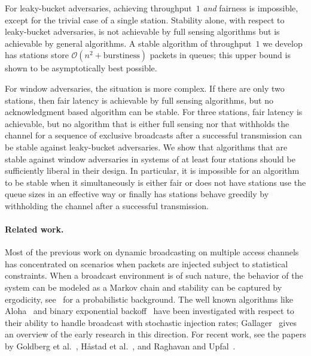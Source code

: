 \documentclass[11pt]{article}
\newcommand{\BBB}{\vspace*{-\bigskipamount}}
\newcommand{\cO}{\mathcal{O}}
\newcommand{\Paragraph}[1]{\BBB\paragraph{#1}}
\begin{document}
For leaky-bucket adversaries, achieving throughput~$1$ \emph{and} fairness is impossible, except for the trivial case of a single station.
Stability alone, with respect to leaky-bucket adversaries, is not achievable by full sensing algorithms but is achievable by general algorithms.
A stable algorithm of throughput~$1$ we develop has stations store $\cO(n^2+\text{burstiness})$ packets in queues; this upper bound is shown to be asymptotically best possible.

For window adversaries, the situation is more complex.
If there are only two stations, then fair latency is achievable by full sensing algorithms, but no acknowledgment based algorithm can be stable.
For three stations, fair latency is achievable, but no algorithm that is either full sensing nor that withholds the channel for a sequence of exclusive broadcasts after a successful transmission can be stable against leaky-bucket adversaries.
We show that algorithms that are stable against window adversaries in systems of at least four stations should be sufficiently liberal in their design.
In particular, it is impossible for an algorithm to be stable when it simultaneously is either fair or does not have stations use the queue sizes in an effective way or finally has stations behave greedily by withholding the channel after a successful transmission.





\Paragraph{Related work.}



Most of the previous work on dynamic broadcasting on multiple access channels has concentrated on scenarios when packets are injected subject to statistical constraints.
When a broadcast environment is of such nature, the behavior of the system can be modeled as a Markov chain and stability can be captured by ergodicity,  see~\cite{MitzenmacherUpfal-book17} for a probabilistic background.
The well known algorithms like Aloha~\cite{Abramson-TIT85} and binary exponential backoff~\cite{MetcalfeB76} have been investigated with respect to their ability to handle broadcast with stochastic injection rates; Gallager~\cite{Gallager85} gives an overview of the early research in this direction.
For recent work, see the papers by Goldberg et al.~\cite{GoldbergJKP04,GoldbergMPS-JACM00}, H\aa stad et al.~\cite{HastadLR-SICOMP96}, and Raghavan and Upfal~\cite{RaghavanU-SICOMP98}.
\end{document}
